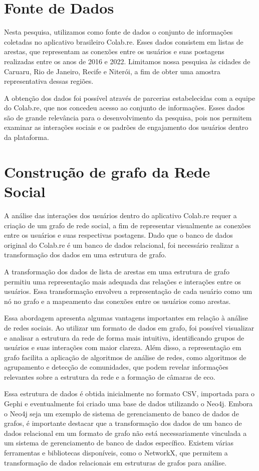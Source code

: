 \section{Fonte de Dados}
Nesta pesquisa, utilizamos como fonte de dados o conjunto de informações coletadas no aplicativo brasileiro Colab.re. Esses dados consistem em listas de arestas, que representam as conexões entre os usuários e suas postagens realizadas entre os anos de 2016 e 2022. Limitamos nossa pesquisa às cidades de Caruaru, Rio de Janeiro, Recife e Niterói, a fim de obter uma amostra representativa dessas regiões.

A obtenção dos dados foi possível através de parcerias estabelecidas com a equipe do Colab.re, que nos concedeu acesso ao conjunto de informações. Esses dados são de grande relevância para o desenvolvimento da pesquisa, pois nos permitem examinar as interações sociais e os padrões de engajamento dos usuários dentro da plataforma.

\section{Construção de grafo da Rede Social}
A análise das interações dos usuários dentro do aplicativo Colab.re requer a criação de um grafo de rede social, a fim de representar visualmente as conexões entre os usuários e suas respectivas postagens. Dado que o banco de dados original do Colab.re é um banco de dados relacional, foi necessário realizar a transformação dos dados em uma estrutura de grafo.

A transformação dos dados de lista de arestas em uma estrutura de grafo permitiu uma representação mais adequada das relações e interações entre os usuários. Essa transformação envolveu a representação de cada usuário como um nó no grafo e a mapeamento das conexões entre os usuários como arestas.

Essa abordagem apresenta algumas vantagens importantes em relação à análise de redes sociais. Ao utilizar um formato de dados em grafo, foi possível visualizar e analisar a estrutura da rede de forma mais intuitiva, identificando grupos de usuários e suas interações com maior clareza. Além disso, a representação em grafo facilita a aplicação de algoritmos de análise de redes, como algoritmos de agrupamento e detecção de comunidades, que podem revelar informações relevantes sobre a estrutura da rede e a formação de câmaras de eco.

Essa estrutura de dados é obtida inicialmente no formato CSV, importada para o Gephi e eventualmente foi criado uma base de dados utilizando o Neo4j. Embora o Neo4j seja um exemplo de sistema de gerenciamento de banco de dados de grafos, é importante destacar que a transformação dos dados de um banco de dados relacional em um formato de grafo não está necessariamente vinculada a um sistema de gerenciamento de banco de dados específico. Existem várias ferramentas e bibliotecas disponíveis, como o NetworkX, que permitem a transformação de dados relacionais em estruturas de grafos para análise.

